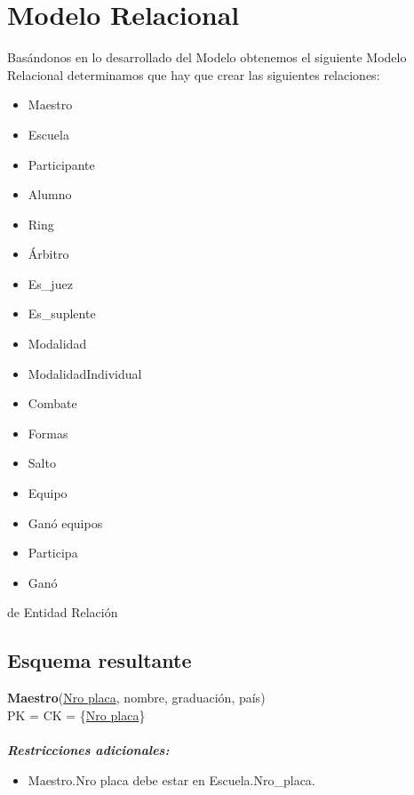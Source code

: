 \newpage
\def\doubleunderline#1{\underline{\underline{#1}}}

\section{Modelo Relacional}

Basándonos en lo desarrollado del Modelo  obtenemos el siguiente Modelo Relacional determinamos que hay que crear las siguientes relaciones:

\begin{itemize}
    \item Maestro
    \item Escuela
    \item Participante
    \item Alumno
    \item Ring
    \item Árbitro
    \item Es\_juez
    \item Es\_suplente
    \item Modalidad
    \item ModalidadIndividual
    \item Combate
    \item Formas
    \item Salto
    \item Equipo
    \item Ganó equipos
    \item Participa
    \item Ganó
\end{itemize}

de Entidad Relación

\subsection{Esquema resultante}


\noindent
\textbf{Maestro}(\underline{Nro placa}, nombre, graduación, país)\\
PK = CK = \{\underline{Nro placa}\}\\\\
\textbf{\textit{Restricciones adicionales:}}\\
\begin{itemize}
    \item Maestro.Nro placa debe estar en Escuela.Nro\_placa.
\end{itemize}

